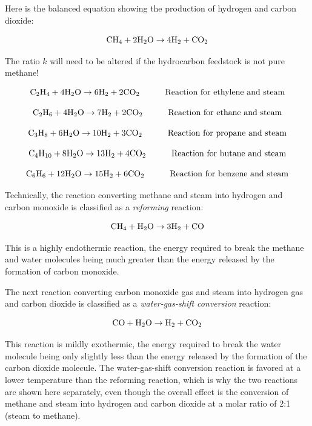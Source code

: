 \vskip 10pt

Here is the balanced equation showing the production of hydrogen and carbon dioxide:

$$\hbox{CH}_4 + \hbox{2H}_2\hbox{O} \to 4\hbox{H}_2 + \hbox{CO}_2$$

The ratio $k$ will need to be altered if the hydrocarbon feedstock is not pure methane!

$$\hbox{C}_2\hbox{H}_4 + \hbox{4H}_2\hbox{O} \to \hbox{6H}_2 + \hbox{2CO}_2 \hbox{\hskip 30pt Reaction for ethylene and steam}$$

$$\hbox{C}_2\hbox{H}_6 + \hbox{4H}_2\hbox{O} \to \hbox{7H}_2 + \hbox{2CO}_2 \hbox{\hskip 30pt Reaction for ethane and steam}$$

$$\hbox{C}_3\hbox{H}_8 + \hbox{6H}_2\hbox{O} \to \hbox{10H}_2 + \hbox{3CO}_2 \hbox{\hskip 30pt Reaction for propane and steam}$$

$$\hbox{C}_4\hbox{H}_{10} + \hbox{8H}_2\hbox{O} \to \hbox{13H}_2 + \hbox{4CO}_2 \hbox{\hskip 30pt Reaction for butane and steam}$$

$$\hbox{C}_6\hbox{H}_6 + \hbox{12H}_2\hbox{O} \to \hbox{15H}_2 + \hbox{6CO}_2 \hbox{\hskip 30pt Reaction for benzene and steam}$$

\vskip 30pt

Technically, the reaction converting methane and steam into hydrogen and carbon monoxide is classified as a {\it reforming} reaction:

$$\hbox{CH}_4 + \hbox{H}_2\hbox{O} \to 3\hbox{H}_2 + \hbox{CO}$$

This is a highly endothermic reaction, the energy required to break the methane and water molecules being much greater than the energy released by the formation of carbon monoxide.  

The next reaction converting carbon monoxide gas and steam into hydrogen gas and carbon dioxide is classified as a {\it water-gas-shift conversion} reaction:

$$\hbox{CO} + \hbox{H}_2\hbox{O} \to \hbox{H}_2 + \hbox{CO}_2$$

This reaction is mildly exothermic, the energy required to break the water molecule being only slightly less than the energy released by the formation of the carbon dioxide molecule.  The water-gas-shift conversion reaction is favored at a lower temperature than the reforming reaction, which is why the two reactions are shown here separately, even though the overall effect is the conversion of methane and steam into hydrogen and carbon dioxide at a molar ratio of 2:1 (steam to methane).






